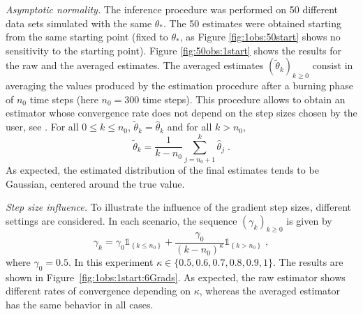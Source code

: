 \documentclass{article}
\newcommand{\parvec}{\theta}
\def\1{\mathds{1}}
\newcommand{\eqsp}{\;}
\begin{document}
{\em Asymptotic normality.}
The inference procedure was performed on 50 different data sets simulated with the same $\theta_*$. The 50 estimates were obtained starting from the same starting point (fixed to $\theta_*$, as Figure \ref{fig:1obs:50start} shows no sensitivity to the starting point). Figure \ref{fig:50obs:1start} shows the results for the raw and the averaged estimates. 
 The averaged estimates $(\widetilde \parvec_k)_{k\geqslant 0}$ consist in averaging the values produced by the estimation procedure after a burning phase of $n_0$ time steps (here $n_0 =300$ time steps). This procedure allows to obtain an estimator whose convergence rate does not depend on the step sizes chosen by the user, see \cite{polyak:juditsky:1992,kushner:yin:1997}. For all $0 \leqslant k\leqslant n_0$, $\widetilde \parvec_k = \widehat\parvec_k $ and for all $k>n_0$,
\[
\widetilde \parvec_k = \frac{1}{k-n_0}\sum_{j= n_0+1}^k\widehat\parvec_j\eqsp. 
\]
As expected, the estimated distribution of the final estimates tends to be Gaussian, centered around the true value.
 
{\em Step size influence.} To illustrate the  influence of the gradient step sizes, different settings are considered. In each scenario, the sequence $(\gamma_k)_{k\geqslant 0}$ is given by
\begin{equation*}
\gamma_k = \gamma_0 \1_{\left\lbrace k \leq n_0 \right\rbrace} + \frac{\gamma_0}{(k - n_0)^{\kappa}}\1_{\left\lbrace k > n_0 \right\rbrace}\eqsp,
\end{equation*}
where $\gamma_0 = 0.5$. In this experiment $\kappa\in\{0.5,0.6,0.7,0.8,0.9,1\}$.
The results are shown in Figure~\ref{fig:1obs:1start:6Grads}. 
As expected, the raw estimator shows different rates of convergence depending on $\kappa$, whereas the averaged estimator has the same behavior in all cases. 
\end{document}

